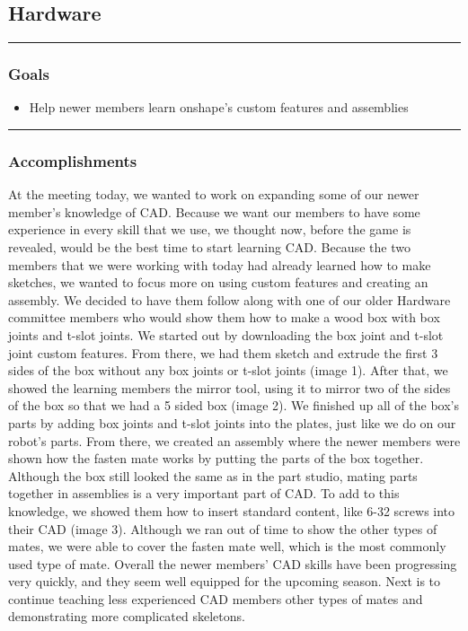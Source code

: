 \subsection*{Hardware}
\noindent\hfil\rule{\textwidth}{.4pt}\hfil
\subsubsection*{Goals}
\begin{itemize}
    \item Help newer members learn onshape’s custom features and assemblies
  

\end{itemize} 

\noindent\hfil\rule{\textwidth}{.4pt}\hfil

\subsubsection*{Accomplishments}
At the meeting today, we wanted to work on expanding some of our newer member’s knowledge of CAD. Because we want our members to have some experience in every skill that we use, we thought now, before the game is revealed, would be the best time to start learning CAD. Because the two members that we were working with today had already learned how to make sketches, we wanted to focus more on using custom features and creating an assembly. We decided to have them follow along with one of our older Hardware committee members who would show them how to make a wood box with box joints and t-slot joints. We started out by downloading the box joint and t-slot joint custom features. From there, we had them sketch and extrude the first 3 sides of the box without any box joints or t-slot joints (image 1). After that, we showed the learning members the mirror tool, using it to mirror two of the sides of the box so that we had a 5 sided box (image 2). We finished up all of the box’s parts by adding box joints and t-slot joints into the plates, just like we do on our robot’s parts. 
From there, we created an assembly where the newer members were shown how the fasten mate works by putting the parts of the box together. Although the box still looked the same as in the part studio, mating parts together in assemblies is a very important part of CAD. To add to this knowledge, we showed them how to insert standard content, like 6-32 screws into their CAD (image 3). Although we ran out of time to show the other types of mates, we were able to cover the fasten mate well, which is the most commonly used type of mate. Overall the newer members’ CAD skills have been progressing very quickly, and they seem well equipped for the upcoming season. Next is to continue teaching less experienced CAD members other types of mates
and demonstrating more complicated skeletons. 


